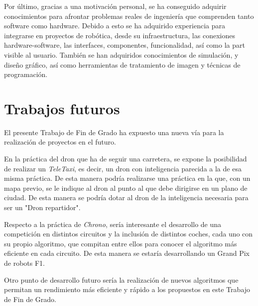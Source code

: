 Por último, gracias a una motivación personal, se ha conseguido adquirir conocimientos para afrontar problemas reales de ingeniería que comprenden tanto software como hardware. Debido a esto se ha adquirido experiencia para integrarse en proyectos de robótica, desde su infraestructura, las conexiones hardware-software, las interfaces, componentes, funcionalidad, así como la part visible al usuario. También se han adquiridos conocimientos de simulación, y diseño gráfico, así como herramientas de tratamiento de imagen y técnicas de programación.

\section{Trabajos futuros} 
El presente Trabajo de Fin de Grado ha expuesto una nueva vía para la realización de proyectos en el futuro.

En la práctica del dron que ha de seguir una carretera, se expone la posibilidad de realizar un \textit{TeleTaxi}, es decir, un dron con inteligencia parecida a la de esa misma práctica. De esta manera podría realizarse una práctica en la que, con un mapa previo, se le indique al dron al punto al que debe dirigirse en un plano de ciudad. De esta manera se podría dotar al dron de la inteligencia necesaria para ser un "Dron repartidor".

Respecto a la práctica de \textit{Chrono}, sería interesante el desarrollo de una competición en distintos circuitos y la inclusión de distintos coches, cada uno con su propio algoritmo, que compitan entre ellos para conocer el algoritmo más eficiente en cada circuito. De esta manera se estaría desarrollando un Grand Pix de robots F1.

Otro punto de desarrollo futuro sería la realización de nuevos algoritmos que permitan un rendimiento más eficiente y rápido a los propuestos en este Trabajo de Fin de Grado.